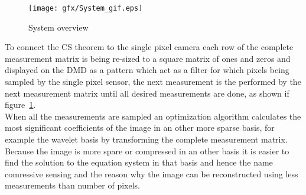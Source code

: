 \begin{figure}[H]
\texttt{[image: gfx/System\_gif.eps]}
	\caption{System overview}
	\label{fig:system_overview}
\end{figure}	

To connect the CS theorem to the single pixel camera each row of the complete measurement matrix is being re-sized to a square matrix of ones and zeros and displayed on the DMD as a pattern which act as a filter for which pixels being sampled by the single pixel sensor, the next measurement is the performed by the next measurement matrix until all desired measurements are done, as shown if figure~\ref{fig:system_overview}.\\[0.1in]

When all the measurements are sampled an optimization algorithm calculates the most significant coefficients of the image in an other more sparse basis, for example the wavelet basis by transforming the complete measurement matrix. Because the image is more spare or compressed in an other basis it is easier to find the solution to the equation system in that basis and hence the name comressive sensing and the reason why the image can be reconstructed using less measurements than number of pixels.    










